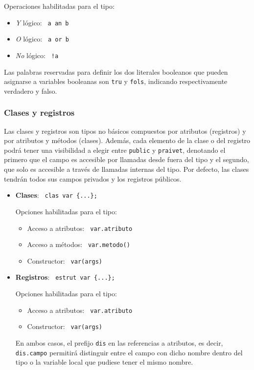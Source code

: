 \documentclass[10pt,a4paper]{article}
\begin{document}
\begin{itemize}
    Operaciones habilitadas para el tipo:
    \begin{itemize}
        \item \textit{Y} lógico: \texttt{\color{blue} a an b}
        \item \textit{O} lógico: \texttt{\color{blue} a or b}
        \item \textit{No} lógico: \texttt{\color{blue} !a}
    \end{itemize}
    Las palabras reservadas para definir los dos literales booleanos que pueden asignarse a variables booleanas son \texttt{\color{blue}tru} y \texttt{\color{blue}fols}, indicando respectivamente verdadero y falso.
\end{itemize}


\subsubsection{Clases y registros}
Las clases y registros son tipos no básicos compuestos por atributos (registros) y por atributos y métodos (clases). Además, cada elemento de la clase o del registro podrá tener una visibilidad a elegir entre \texttt{\color{blue}public} y \texttt{\color{blue}praivet}, denotando el primero que el campo es accesible por llamadas desde fuera del tipo y el segundo, que solo es accesible a través de llamadas internas del tipo. Por defecto, las clases tendrán todos sus campos privados y los registros públicos.

\begin{itemize}
    \item \textbf{Clases}: \texttt{\color{blue} clas var \{...\};}
    
    Opciones habilitadas para el tipo:
    \begin{itemize}
        \item Acceso a atributos: \texttt{\color{blue} var.atributo}
        \item Acceso a métodos: \texttt{\color{blue} var.metodo()}
        \item Constructor: \texttt{\color{blue} var(args)}
    \end{itemize}
    \item \textbf{Registros}: \texttt{\color{blue} estrut var \{...\};}
    
    Opciones habilitadas para el tipo:
    \begin{itemize}
        \item Acceso a atributos: \texttt{\color{blue} var.atributo}
        \item Constructor: \texttt{\color{blue} var(args)}
    \end{itemize}

    En ambos casos, el prefijo \texttt{\color{blue}dis} en las referencias a atributos, es decir, \texttt{\color{blue}dis.campo} permitirá distinguir entre el campo con dicho nombre dentro del tipo o la variable local que pudiese tener el mismo nombre.
\end{itemize}
\end{document}

